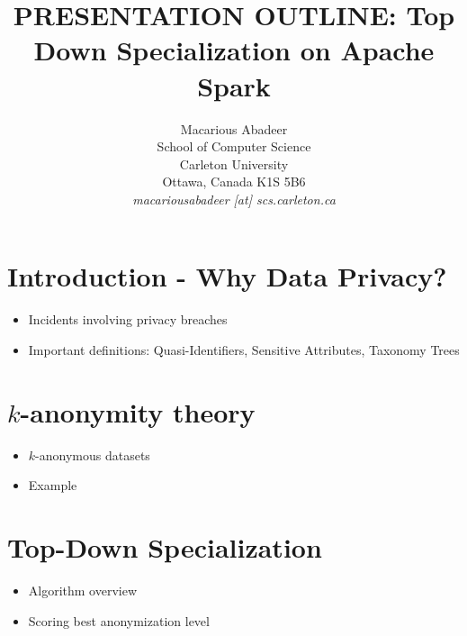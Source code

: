\documentclass[11pt]{article}       %
\newenvironment{slide}[1]        {\section{#1} \begin{itemize}}%
                                 {\end{itemize}}
\begin{document}


\title{PRESENTATION OUTLINE: Top Down Specialization on Apache Spark\texttrademark}


\author{
Macarious Abadeer\\
School of Computer Science\\
Carleton University\\
Ottawa, Canada K1S 5B6\\
{\em macariousabadeer [at] scs.carleton.ca}
} %

\maketitle

\begin{slide}{Introduction - Why Data Privacy?}
\item Incidents involving privacy breaches
\item Important definitions: Quasi-Identifiers, Sensitive Attributes, Taxonomy Trees
\end{slide}

\begin{slide}{$k$-anonymity theory}
\item $k$-anonymous datasets
\item Example
\end{slide}

\begin{slide}{Top-Down Specialization}
\item Algorithm overview
\item Scoring best anonymization level
\end{slide}
\end{document}
